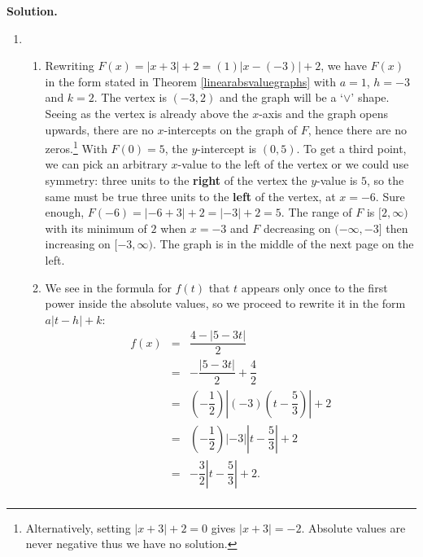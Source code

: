 \documentclass{ximera}
\begin{document}
\begin{example}
\begin {enumerate}
\begin{center}
\end{center}

\end{enumerate}


{\bf Solution.}

\begin{enumerate}

\item \begin{enumerate}

\item Rewriting $F(x) = |x + 3| + 2 = (1)|x - (-3)| + 2$, we have $F(x)$ in the form stated in Theorem \ref{linearabsvaluegraphs} with $a = 1$, $h = -3$ and $k = 2$.  The vertex is $(-3, 2)$ and the graph will be a `$\vee$' shape.  Seeing as the vertex is already above the $x$-axis and the graph opens upwards, there are no $x$-intercepts on the graph of $F$, hence there are no zeros.\footnote{Alternatively, setting $|x + 3| + 2 = 0$ gives $|x + 3| = -2$. Absolute values are never negative thus we have no solution.}  With $F(0) = 5$, the $y$-intercept is $(0,5)$.  To get a third point, we can pick an arbitrary $x$-value to the left of the vertex or we could use symmetry: three units to the \textbf{right} of the vertex the $y$-value is $5$, so the same must be true three units to the \textbf{left} of the vertex, at $x = -6$.  Sure enough, $F(-6) = |-6 + 3| + 2 = |-3| + 2 = 5$.  The range of $F$ is $[2, \infty)$ with its minimum of $2$ when $x = -3$ and $F$ decreasing on $(-\infty, -3]$ then increasing on $[-3, \infty)$.  The graph is in the middle of the next page on the left.

\item We see in the formula for $f(t)$ that $t$ appears only once to the first power inside the absolute values, so we proceed to rewrite it in the form $a|t-h|+k$: \[ \begin{array}{rcl}

f(x) & =&  \dfrac{4 - |5-3t|}{2} \\ [10pt]
      & = & - \dfrac{|5-3t|}{2} + \dfrac{4}{2} \\ [12pt]
      & = & \left(-\dfrac{1}{2}\right) \left| (-3) \left( t - \dfrac{5}{3} \right) \right| + 2  \\  [12pt]
     & = &  \left(-\dfrac{1}{2}\right) |-3|  \left| t - \dfrac{5}{3}  \right|  + 2 \\ [12pt]
     & = & -\dfrac{3}{2}   \left| t - \dfrac{5}{3}  \right|  + 2.  \\ 
     

\end{array}\]
\end{enumerate}
\end{enumerate}
\end{example}
\end{document}
